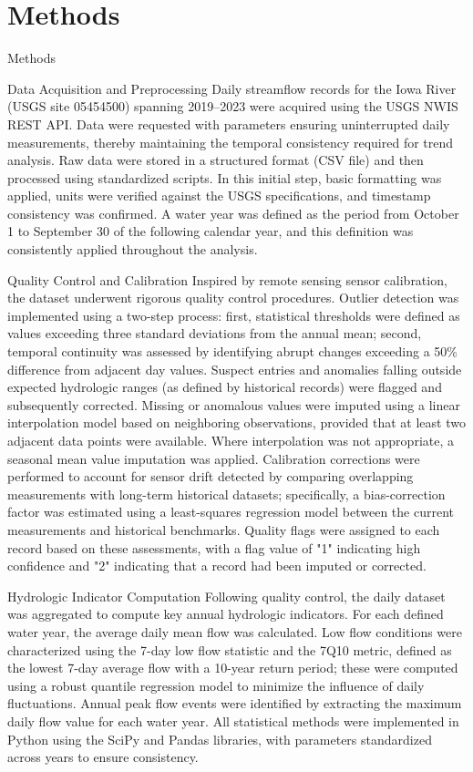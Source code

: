 \documentclass[preprint,12pt]{elsarticle}
\begin{document}
\section{Methods}

Methods

Data Acquisition and Preprocessing
Daily streamflow records for the Iowa River (USGS site 05454500) spanning 2019–2023 were acquired using the USGS NWIS REST API. Data were requested with parameters ensuring uninterrupted daily measurements, thereby maintaining the temporal consistency required for trend analysis. Raw data were stored in a structured format (CSV file) and then processed using standardized scripts. In this initial step, basic formatting was applied, units were verified against the USGS specifications, and timestamp consistency was confirmed. A water year was defined as the period from October 1 to September 30 of the following calendar year, and this definition was consistently applied throughout the analysis.

Quality Control and Calibration
Inspired by remote sensing sensor calibration, the dataset underwent rigorous quality control procedures. Outlier detection was implemented using a two-step process: first, statistical thresholds were defined as values exceeding three standard deviations from the annual mean; second, temporal continuity was assessed by identifying abrupt changes exceeding a 50\% difference from adjacent day values. Suspect entries and anomalies falling outside expected hydrologic ranges (as defined by historical records) were flagged and subsequently corrected. Missing or anomalous values were imputed using a linear interpolation model based on neighboring observations, provided that at least two adjacent data points were available. Where interpolation was not appropriate, a seasonal mean value imputation was applied. Calibration corrections were performed to account for sensor drift detected by comparing overlapping measurements with long-term historical datasets; specifically, a bias-correction factor was estimated using a least-squares regression model between the current measurements and historical benchmarks. Quality flags were assigned to each record based on these assessments, with a flag value of "1" indicating high confidence and "2" indicating that a record had been imputed or corrected.

Hydrologic Indicator Computation
Following quality control, the daily dataset was aggregated to compute key annual hydrologic indicators. For each defined water year, the average daily mean flow was calculated. Low flow conditions were characterized using the 7-day low flow statistic and the 7Q10 metric, defined as the lowest 7-day average flow with a 10-year return period; these were computed using a robust quantile regression model to minimize the influence of daily fluctuations. Annual peak flow events were identified by extracting the maximum daily flow value for each water year. All statistical methods were implemented in Python using the SciPy and Pandas libraries, with parameters standardized across years to ensure consistency.
\end{document}
